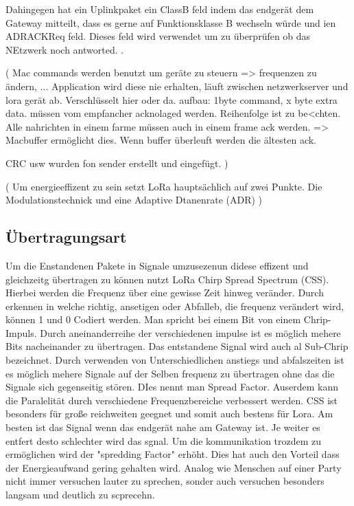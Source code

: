 \documentclass[a4paper,12pt]{article}
\begin{document}
            Dahingegen hat ein Uplinkpaket ein ClassB feld indem das endgerät dem Gateway mitteilt, dass es gerne auf Funktionsklasse B wechseln würde und ien ADRACKReq feld. Dieses feld wird verwendet um zu überprüfen ob das NEtzwerk noch antworted. .

            \cite{LoRaSpec}(
                Mac commands werden benutzt um geräte zu steuern => frequenzen zu ändern, ...
                Application wird diese nie erhalten, läuft zwischen netzwerkserver und lora gerät ab.
                Verschlüsselt hier oder da.
                aufbau: 1byte command, x byte extra data.
                müssen vom empfancher acknolaged werden. Reihenfolge ist zu be<chten. Alle nahrichten in einem farme müssen auch in einem frame ack werden. => Macbuffer ermöglicht dies. Wenn buffer überleuft werden die ältesten ack. 
                

                CRC usw wurden fon sender erstellt und eingefügt.
            )


            
                
            
            \cite{LoraClasses}(
                Um energieeffizent zu sein setzt LoRa hauptsächlich auf zwei Punkte. Die Modulationstechnick und eine Adaptive Dtanenrate (ADR)
            )
        \subsection{Übertragungsart}\label{sec:Modulation}
            Um die Enstandenen Pakete in Signale umzusezenun didese effizent und gleichzeitg übertragen zu können nutzt LoRa Chirp Spread Spectrum (CSS). Hierbei werden die Frequenz über eine gewisse Zeit hinweg veränder. Durch erkennen in welche richtig, ansetigen oder Abfalleb, die frequenz verändert wird, können
            1 und 0 Codiert werden. Man spricht bei einem Bit von einem Chrip-Impuls. Durch aneinanderreihe der verschiedenen impulse ist es möglich mehere Bits nacheinander zu übertragen. Das entstandene Signal wird auch al Sub-Chrip bezeichnet. Durch verwenden von Unterschiedlichen anstiegs und abfalszeiten ist es möglich mehere
            Signale auf der Selben frequenz zu übertragen ohne das die Signale sich gegenseitig stören. DIes nennt man Spread Factor.
            Auserdem kann die Paralelität durch verschiedene Frequenzbereiche verbessert werden.  CSS ist besonders für große reichweiten geegnet und somit auch bestens für Lora. Am besten ist das Signal wenn das endgerät nahe am Gateway ist. Je weiter es entfert desto schlechter wird das sgnal. Um die kommunikation 
            trozdem zu ermöglichen wird der "spredding Factor" erhöht. Dies hat auch den Vorteil dass der Energieaufwand gering gehalten wird. Analog wie Menschen auf einer Party nicht immer versuchen lauter zu sprechen, sonder auch versuchen besonders langsam und deutlich zu scprecehn.
\end{document}
